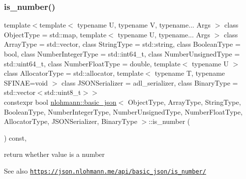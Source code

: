 \subsubsection{\texorpdfstring{is\+\_\+number()}{is\_number()}}
{\footnotesize\ttfamily template$<$template$<$ typename U, typename V, typename... Args $>$ class Object\+Type = std\+::map, template$<$ typename U, typename... Args $>$ class Array\+Type = std\+::vector, class String\+Type  = std\+::string, class Boolean\+Type  = bool, class Number\+Integer\+Type  = std\+::int64\+\_\+t, class Number\+Unsigned\+Type  = std\+::uint64\+\_\+t, class Number\+Float\+Type  = double, template$<$ typename U $>$ class Allocator\+Type = std\+::allocator, template$<$ typename T, typename S\+F\+I\+N\+A\+E=void $>$ class J\+S\+O\+N\+Serializer = adl\+\_\+serializer, class Binary\+Type  = std\+::vector$<$std\+::uint8\+\_\+t$>$$>$ \\
constexpr bool \hyperlink{classnlohmann_1_1basic__json}{nlohmann\+::basic\+\_\+json}$<$ Object\+Type, Array\+Type, String\+Type, Boolean\+Type, Number\+Integer\+Type, Number\+Unsigned\+Type, Number\+Float\+Type, Allocator\+Type, J\+S\+O\+N\+Serializer, Binary\+Type $>$\+::is\+\_\+number (\begin{DoxyParamCaption}{ }\end{DoxyParamCaption}) const\hspace{0.3cm}{\ttfamily [inline]}, {\ttfamily [noexcept]}}



return whether value is a number 

\begin{DoxySeeAlso}{See also}
\href{https://json.nlohmann.me/api/basic_json/is_number/}{\tt https\+://json.\+nlohmann.\+me/api/basic\+\_\+json/is\+\_\+number/} 
\end{DoxySeeAlso}
\mbox{\label{classnlohmann_1_1basic__json_a116cdb9300b56519fc9cf756609296cb}} 
